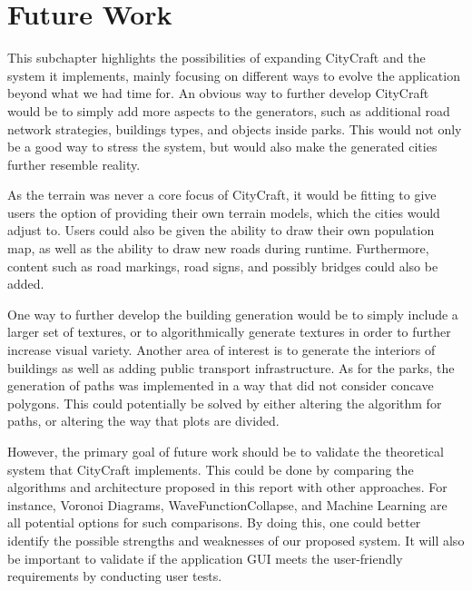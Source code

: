 \section{Future Work}
This subchapter highlights the possibilities of expanding CityCraft and the system it implements, mainly focusing on different ways to evolve the application beyond what we had time for.
An obvious way to further develop CityCraft would be to simply add more aspects to the generators, such as additional road network strategies, buildings types, and objects inside parks.
This would not only be a good way to stress the system, but would also make the generated cities further resemble reality.
 
As the terrain was never a core focus of CityCraft, it would be fitting to give users the option of providing their own terrain models, which the cities would adjust to.
Users could also be given the ability to draw their own population map, as well as the ability to draw new roads during runtime.
Furthermore, content such as road markings, road signs, and possibly bridges could also be added.
  
One way to further develop the building generation would be to simply include a larger set of textures, or to algorithmically generate textures in order to further increase visual variety.
Another area of interest is to generate the interiors of buildings as well as adding public transport infrastructure.
As for the parks, the generation of paths was implemented in a way that did not consider concave polygons.
This could potentially be solved by either altering the algorithm for paths, or altering the way that plots are divided.

However, the primary goal of future work should be to validate the theoretical system that CityCraft implements.
This could be done by comparing the algorithms and architecture proposed in this report with other approaches.
For instance, Voronoi Diagrams, WaveFunctionCollapse, and Machine Learning are all potential options for such comparisons.
By doing this, one could better identify the possible strengths and weaknesses of our proposed system.
It will also be important to validate if the application GUI meets the user-friendly requirements by conducting user tests.